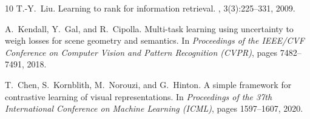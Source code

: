 \documentclass[12pt]{article}
\begin{document}
\begin{thebibliography}{10}
T.-Y.~Liu.
\newblock Learning to rank for information retrieval.
, 3(3):225--331, 2009.

A.~Kendall, Y.~Gal, and R.~Cipolla.
\newblock Multi-task learning using uncertainty to weigh losses for scene geometry and semantics.
\newblock In {\em Proceedings of the IEEE/CVF Conference on Computer Vision and Pattern Recognition (CVPR)}, pages 7482--7491, 2018.

T.~Chen, S.~Kornblith, M.~Norouzi, and G.~Hinton.
\newblock A simple framework for contrastive learning of visual representations.
\newblock In {\em Proceedings of the 37th International Conference on Machine Learning (ICML)}, pages 1597--1607, 2020.

\end{thebibliography}
\end{document}
